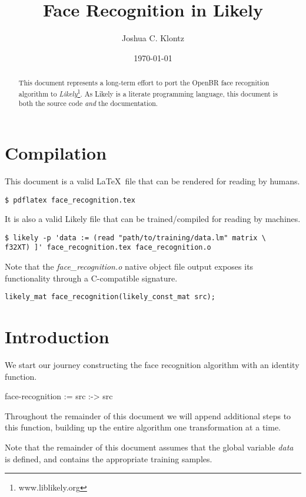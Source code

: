 \documentclass{article}
\title{Face Recognition in Likely}
\author{Joshua C. Klontz}
\date{\today}
\begin{document}
\maketitle

\begin{abstract}
This document represents a long-term effort to port the OpenBR face recognition algorithm to \emph{Likely}\footnote{www.liblikely.org}.
As Likely is a literate programming language, this document is both the source code \emph{and} the documentation.
\end{abstract}

\section{Compilation}
This document is a valid \LaTeX\ file that can be rendered for reading by humans.

\begin{verbatim}
$ pdflatex face_recognition.tex
\end{verbatim}

It is also a valid Likely file that can be trained/compiled for reading by machines.

\begin{verbatim}
$ likely -p 'data := (read "path/to/training/data.lm" matrix \
f32XT) ]' face_recognition.tex face_recognition.o
\end{verbatim}

Note that the \emph{face\_recognition.o} native object file output exposes its functionality through a C-compatible signature.

\begin{verbatim}
likely_mat face_recognition(likely_const_mat src);
\end{verbatim}

\section{Introduction}
We start our journey constructing the face recognition algorithm with an identity function.

\begin{likely}
face-recognition :=
  src :->
    src
\end{likely}

Throughout the remainder of this document we will append additional steps to this function, building up the entire algorithm one transformation at a time.

Note that the remainder of this document assumes that the global variable \emph{data} is defined, and contains the appropriate training samples.
\end{document}
